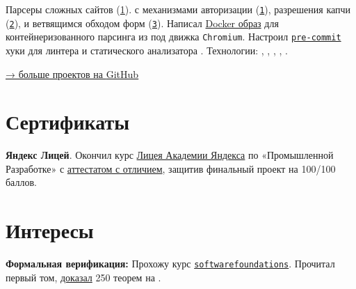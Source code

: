 \documentclass[margin,line]{resume}
\begin{document}
\begin{resume}
\begin{description}[leftmargin=0pt, itemindent=*, itemsep=8pt]
    \item[Заказная разработка:] Парсеры сложных сайтов
      (\href{https://github.com/alchemmist/portu-hack}{1}).  с
      механизмами авторизации
      (\href{https://github.com/alchemmist/portu-hack/blob/develop/parser/parser/searcher/auth.py}{\texttt{1}}),
      разрешения капчи
      (\href{https://github.com/alchemmist/portu-hack/blob/develop/parser/parser/searcher/captcha.py}{\texttt{2}}),
      и ветвящимся обходом форм
      (\href{https://github.com/alchemmist/portu-hack/blob/develop/parser/parser/searcher/snif.py}{\texttt{3}}).
      Написал
      \href{https://github.com/alchemmist/portu-hack/blob/develop/parser/Dockerfile}{Docker
      образ} для контейнеризованного парсинга
       из под движка \texttt{Chromium}.
      Настроил
      \href{https://github.com/alchemmist/portu-hack/blob/develop/pre-commit-config.yaml}{\texttt{pre-commit}}
      хуки для линтера
       и статического анализатора .
      Технологии:
      , ,
      ,
      ,
      .

      \vspace{-2mm}
    \item[]\vspace{1mm}\hypersetup{urlcolor=gray!90}\large
      \href{https://github.com/alchemmist}{→ больше проектов на
      \underline{GitHub}}
      \vspace{-3mm}
  \end{description}
  \section{\mysidestyle Сертификаты}
  \textbf{Яндекс Лицей}. Окончил курс
  \href{https://lyceum.yandex.ru/}{Лицея
  Академии Яндекса} по «Промышленной Разработке» с
  \href{https://alchemmist.github.io/CV/attachments/yandex-lyceum.pdf}{аттестатом
  с отличием}, защитив финальный проект на 100/100 баллов.

  \section{\mysidestyle Интересы}\vspace{0.7mm}

  {\textbf{Формальная верификация:} Прохожу курс
    \texttt{\href{https://softwarefoundations.cis.upenn.edu}{softwarefoundations}}.
    Прочитал первый том,
    \href{https://github.com/alchemmist/coq-learning}{доказал} 250
  теорем на .} \\


\end{resume}
\end{document}
